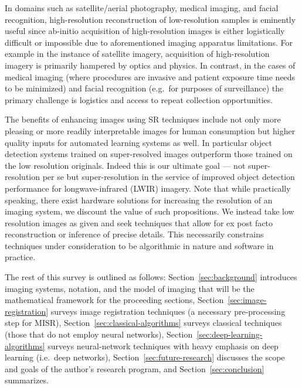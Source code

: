 In domains such as satellite/aerial photography, medical imaging, and facial recognition,
high-resolution reconstruction of low-resolution samples is eminently useful since ab-initio acquisition of high-resolution images is either logistically difficult or impossible due to aforementioned imaging apparatus limitations.
%
For example in the instance of satellite imagery, acquisition of high-resolution imagery is primarily hampered by optics and physics.
%
In contrast, in the cases of medical imaging (where procedures are invasive and patient exposure time needs to be minimized\cite{doi:10.1002.cmr.a.21249}) and facial recognition (e.g.\ for purposes of surveillance) the primary challenge is logistics and access to repeat collection opportunities.

The benefits of enhancing images using SR techniques include not only more pleasing or more readily interpretable images for human consumption but higher quality inputs for automated learning systems as well.
%
In particular object detection systems trained on super-resolved images outperform those trained on the low
resolution originals\cite{effectssuperres}.
%
Indeed this is our ultimate goal --- not super-resolution per se but super-resolution in the service of improved object detection performance for longwave-infrared (LWIR) imagery.
%
Note that while practically speaking, there exist hardware solutions for increasing the resolution of an imaging
system, we discount the value of such propositions.
%
We instead take low resolution images as given and seek techniques that allow for ex post facto reconstruction or inference of precise details.
%
This necessarily constrains techniques under consideration to be algorithmic in nature and software in practice.

The rest of this survey is outlined as follows: Section~\ref{sec:background} introduces imaging systems, notation, and the model of imaging that will be the mathematical framework for the proceeding sections, Section~\ref{sec:image-registration} surveys image registration techniques (a necessary pre-processing step for MISR), Section~\ref{sec:classical-algorithms} surveys classical techniques (those that do not employ neural networks), Section~\ref{sec:deep-learning-algorithms} surveys neural-network techniques with heavy emphasis on deep learning (i.e.\ deep networks), Section~\ref{sec:future-research} discusses the scope and goals of the author's research program, and Section~\ref{sec:conclusion} summarizes.
